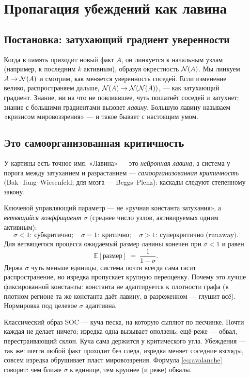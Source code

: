 \chapter{Пропагация убеждений как лавина}
\label{ch:propagation}

\section{Постановка: затухающий градиент уверенности}

Когда в память приходит новый факт $A$, он линкуется к начальным узлам (например, к
последним $k$ активным), образуя окрестность $\mathcal{N}(A)$. Мы линкуем $A\to\mathcal{N}(A)$
и смотрим, как меняется уверенность соседей. Если изменение велико, распространяем
дальше, $\mathcal{N}(A)\to\mathcal{N}(\mathcal{N}(A))$, — как затухающий градиент. Знание, ни на
что не повлиявшее, чуть пошатнёт соседей и затухнет; знание с большими градиентами
вызовет \emph{лавину}. Большую лавину называем «кризисом мировоззрения» — и такое
бывает с настоящим умом.

\section{Это самоорганизованная критичность}

У картины есть точное имя. «Лавина» — это \emph{нейронная лавина}, а система у
порога между затуханием и разрастанием — \emph{самоорганизованная критичность}
(Bak–Tang–Wiesenfeld; для мозга — Beggs–Plenz): каскады следуют степенному закону.

Ключевой управляющий параметр — не «ручная константа затухания», а \emph{ветвящийся
коэффициент} $\sigma$ (среднее число узлов, активируемых одним активным):
\[
\sigma<1:\ \text{субкритично};\quad \sigma=1:\ \text{критично};\quad
\sigma>1:\ \text{суперкритично (runaway)}.
\]
Для ветвящегося процесса ожидаемый размер лавины конечен при $\sigma<1$ и равен
\begin{equation}
\mathbb{E}[\text{размер}]\;=\;\frac{1}{1-\sigma}.
\label{eq:avalanche}
\end{equation}
Держа $\sigma$ чуть меньше единицы, система почти всегда сама гасит распространение,
но изредка пропускает крупную переоценку. Почему это лучше фиксированной константы:
константа не адаптируется к плотности графа (в плотном регионе та же константа даёт
лавину, в разреженном — глушит всё). Нормировка под целевое $\sigma$ адаптивна.

\begin{intuition}
Классический образ SOC — куча песка, на которую сыплют по песчинке. Почти каждая
не делает ничего; изредка одна вызывает оползень; ещё реже — обвал, перестраивающий
склон. Куча сама держится у критического угла. Убеждения — так же: почти любой факт
проходит без следа, изредка меняет соседние взгляды, совсем изредка обрушивает
пласт мировоззрения. Формула \eqref{eq:avalanche} говорит: чем ближе $\sigma$ к
единице, тем крупнее (и реже) обвалы.
\end{intuition}

